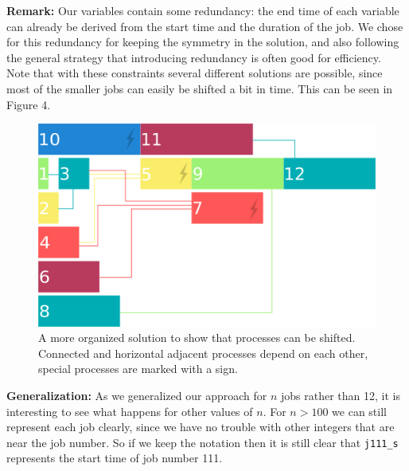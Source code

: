 \documentclass[a4paper]{article}
\begin{document}
{\bf Remark:}
Our variables contain some redundancy: the end time of each variable can already be derived from the start time and the duration of the job. We chose for this redundancy for keeping the symmetry in the solution, and also following the general strategy that introducing redundancy is often good for efficiency.\\

Note that with these constraints several different solutions are possible, since most of the smaller jobs can easily be shifted a bit in time. This can be seen in Figure 4.\\

\begin{figure}[H]
		\centering
			\includegraphics[scale=0.7]{timeline.png}
		\caption{A more organized solution to show that processes can be shifted. Connected and horizontal adjacent processes depend on each other, special processes are marked with a sign.}
\end{figure}

{\bf Generalization:} 
As we generalized our approach for $n$ jobs rather than 12, it is interesting to see what happens for other values of $n$. For $n > 100$ we can still represent each job clearly, since we have no trouble with other integers that are near the job number. So if we keep the notation then it is still clear that {\tt j111\_s} represents the start time of job number 111.
\end{document}
